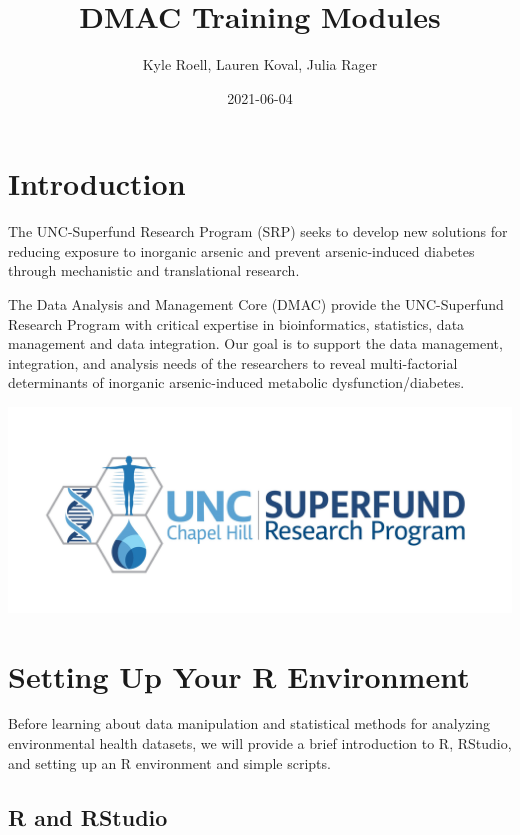\documentclass[
]{book}
\title{DMAC Training Modules}
\author{Kyle Roell, Lauren Koval, Julia Rager}
\date{2021-06-04}
\begin{document}
\maketitle

{
\setcounter{tocdepth}{1}
\tableofcontents
}
\hypertarget{introduction}{%
\chapter{Introduction}\label{introduction}}

The UNC-Superfund Research Program (SRP) seeks to develop new solutions for reducing exposure to inorganic arsenic and prevent arsenic-induced diabetes through mechanistic and translational research.

The Data Analysis and Management Core (DMAC) provide the UNC-Superfund Research Program with critical expertise in bioinformatics, statistics, data management and data integration. Our goal is to support the data management, integration, and analysis needs of the researchers to reveal multi-factorial determinants of inorganic arsenic-induced metabolic dysfunction/diabetes.

\includegraphics[width=45.58in]{_book/test1_files/figure-html/SRP_logo}

\hypertarget{intro}{%
\chapter{Setting Up Your R Environment}\label{intro}}

Before learning about data manipulation and statistical methods for analyzing environmental health datasets, we will provide a brief introduction to R, RStudio, and setting up an R environment and simple scripts.

\hypertarget{r-and-rstudio}{%
\section{R and RStudio}\label{r-and-rstudio}}
\end{document}

